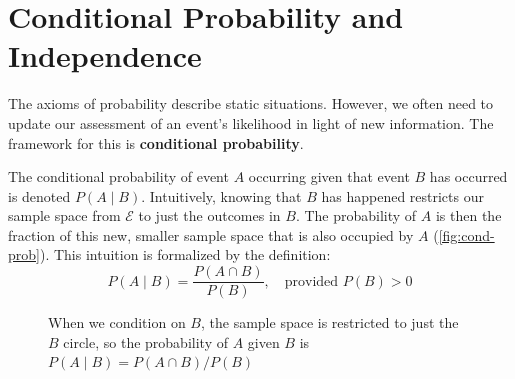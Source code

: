 \section{Conditional Probability and Independence}
The axioms of probability describe static situations. However, we often need to update our assessment of an event's likelihood in light of new information. The framework for this is \textbf{conditional probability}.

The conditional probability of event $A$ occurring given that event $B$ has occurred is denoted $P(A \mid B)$. Intuitively, knowing that $B$ has happened restricts our sample space from $\mathcal{E}$ to just the outcomes in $B$. The probability of $A$ is then the fraction of this new, smaller sample space that is also occupied by $A$ (\autoref{fig:cond-prob}). This intuition is formalized by the definition:
\begin{equation}
    P(A \mid B) = \frac{P(A \cap B)}{P(B)}, \quad \text{provided } P(B) > 0
    \label{eq:cond-prob}
\end{equation}

\begin{figure}[h]
    \centering
    \caption{When we condition on $B$, the sample space is restricted to just the $B$ circle, so the probability of $A$ given $B$ is $P(A\mid B)=P(A\cap B)/P(B)$}
    \label{fig:cond-prob}
\end{figure}

